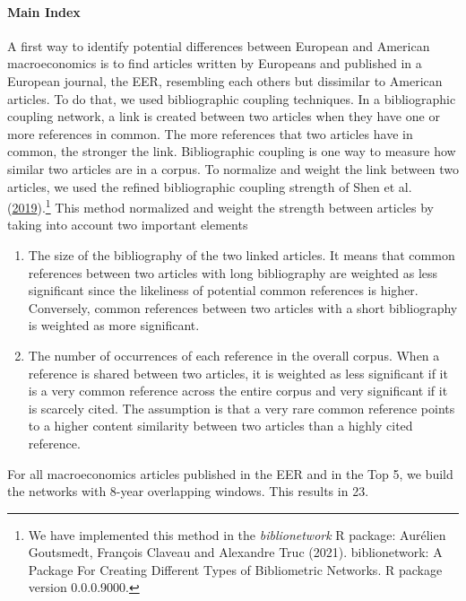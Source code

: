 \documentclass[
  12pt,
  onecolumn]{article}
\providecommand{\tightlist}{%
  \setlength{\itemsep}{0pt}\setlength{\parskip}{0pt}}
\begin{document}
\hypertarget{main-index}{%
\paragraph*{Main Index}\label{main-index}}

A first way to identify potential differences between European and
American macroeconomics is to find articles written by Europeans and
published in a European journal, the EER, resembling each others but
dissimilar to American articles. To do that, we used bibliographic
coupling techniques. In a bibliographic coupling network, a link is
created between two articles when they have one or more references in
common. The more references that two articles have in common, the
stronger the link. Bibliographic coupling is one way to measure how
similar two articles are in a corpus. To normalize and weight the link
between two articles, we used the refined bibliographic coupling
strength of Shen et al.
(\protect\hyperlink{ref-shen2019}{2019}).\footnote{We have implemented
  this method in the \emph{biblionetwork} R package: Aurélien Goutsmedt,
  François Claveau and Alexandre Truc (2021). biblionetwork: A Package
  For Creating Different Types of Bibliometric Networks. R package
  version 0.0.0.9000.} This method normalized and weight the strength
between articles by taking into account two important elements

\begin{enumerate}
\def\labelenumi{\arabic{enumi}.}
\tightlist
\item
  The size of the bibliography of the two linked articles. It means that
  common references between two articles with long bibliography are
  weighted as less significant since the likeliness of potential common
  references is higher. Conversely, common references between two
  articles with a short bibliography is weighted as more significant.
\item
  The number of occurrences of each reference in the overall corpus.
  When a reference is shared between two articles, it is weighted as
  less significant if it is a very common reference across the entire
  corpus and very significant if it is scarcely cited. The assumption is
  that a very rare common reference points to a higher content
  similarity between two articles than a highly cited reference.
\end{enumerate}

For all macroeconomics articles published in the EER and in the Top 5,
we build the networks with 8-year overlapping windows. This results in
23.
\end{document}
